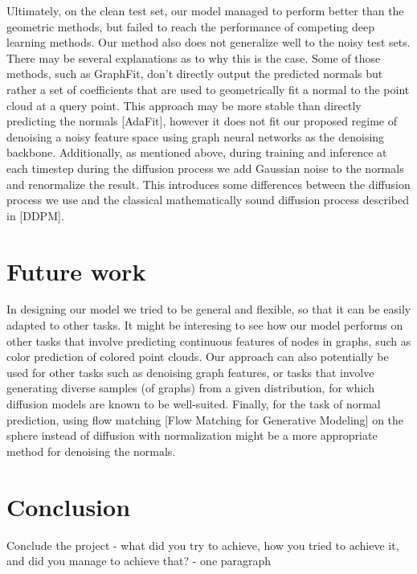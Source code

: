 \documentclass{acmart}
\begin{document}
Ultimately, on the clean test set, our model managed to perform better than the geometric methods, but failed to reach the performance of competing deep learning methods. Our method also does not generalize well to the noisy test sets. There may be several explanations as to why this is the case. Some of those methods, such as GraphFit, don't directly output the predicted normals but rather a set of coefficients that are used to geometrically fit a normal to the point cloud at a query point. This approach may be more stable than directly predicting the normals [AdaFit], however it does not fit our proposed regime of denoising a noisy feature space using graph neural networks as the denoising backbone. Additionally, as mentioned above, during training and inference at each timestep during the diffusion process we add Gaussian noise to the normals and renormalize the result. This introduces some differences between the diffusion process we use and the classical mathematically sound diffusion process described in [DDPM].


\section{Future work}
In designing our model we tried to be general and flexible, so that it can be easily adapted to other tasks. It might be interesing to see how our model performs on other tasks that involve predicting continuous features of nodes in graphs, such as color prediction of colored point clouds. Our approach can also potentially be used for other tasks such as denoising graph features, or tasks that involve generating diverse samples (of graphs) from a given distribution, for which diffusion models are known to be well-suited.
Finally, for the task of normal prediction, using flow matching [Flow Matching for Generative Modeling] on the sphere instead of diffusion with normalization might be a more appropriate method for denoising the normals.

\section{Conclusion}
Conclude the project - what did you try to achieve, how you tried to achieve it, and did you manage to achieve that?  - one paragraph



\end{document}
